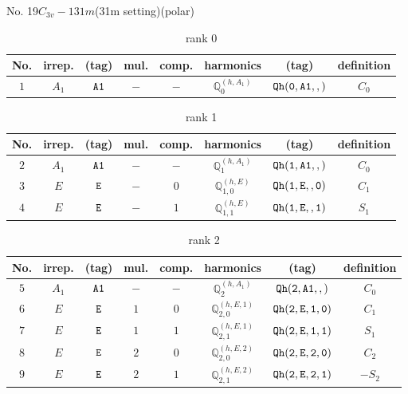 \documentclass[fleqn,8pt]{jsarticle}
\begin{document}
\setcounter{MaxMatrixCols}{16}

\begin{center}
\LARGE
No. 19\quad$C_{3v}-1$\quad$31m$\quad(31m setting)\quad[ trigonal ] (polar)
\end{center}
\begin{table}[ht!]
\begin{center}
\caption{rank 0}
\renewcommand{\arraystretch}{1.3}
\begin{tabular}{cccccccc} \hline \hline
No. & irrep. & (tag) & mul. & comp. & harmonics & (tag) & definition \\ \hline
$ 1 $ & $ A_{1} $ & $ {\tt A1} $ & $ - $ & $ - $ & $ \mathbb{Q}_{0}^{(h,A_{1})} $ & $ {\tt Qh(0,A1,,)} $ & $ C_{0} $ \\
 \hline \hline
\end{tabular}
\end{center}
\end{table}
\begin{table}[ht!]
\begin{center}
\caption{rank 1}
\renewcommand{\arraystretch}{1.3}
\begin{tabular}{cccccccc} \hline \hline
No. & irrep. & (tag) & mul. & comp. & harmonics & (tag) & definition \\ \hline
$ 2 $ & $ A_{1} $ & $ {\tt A1} $ & $ - $ & $ - $ & $ \mathbb{Q}_{1}^{(h,A_{1})} $ & $ {\tt Qh(1,A1,,)} $ & $ C_{0} $ \\
$ 3 $ & $ E $ & $ {\tt E} $ & $ - $ & $ 0 $ & $ \mathbb{Q}_{1,0}^{(h,E)} $ & $ {\tt Qh(1,E,,0)} $ & $ C_{1} $ \\
$ 4 $ & $ E $ & $ {\tt E} $ & $ - $ & $ 1 $ & $ \mathbb{Q}_{1,1}^{(h,E)} $ & $ {\tt Qh(1,E,,1)} $ & $ S_{1} $ \\
 \hline \hline
\end{tabular}
\end{center}
\end{table}
\begin{table}[ht!]
\begin{center}
\caption{rank 2}
\renewcommand{\arraystretch}{1.3}
\begin{tabular}{cccccccc} \hline \hline
No. & irrep. & (tag) & mul. & comp. & harmonics & (tag) & definition \\ \hline
$ 5 $ & $ A_{1} $ & $ {\tt A1} $ & $ - $ & $ - $ & $ \mathbb{Q}_{2}^{(h,A_{1})} $ & $ {\tt Qh(2,A1,,)} $ & $ C_{0} $ \\
$ 6 $ & $ E $ & $ {\tt E} $ & $ 1 $ & $ 0 $ & $ \mathbb{Q}_{2,0}^{(h,E,1)} $ & $ {\tt Qh(2,E,1,0)} $ & $ C_{1} $ \\
$ 7 $ & $ E $ & $ {\tt E} $ & $ 1 $ & $ 1 $ & $ \mathbb{Q}_{2,1}^{(h,E,1)} $ & $ {\tt Qh(2,E,1,1)} $ & $ S_{1} $ \\
$ 8 $ & $ E $ & $ {\tt E} $ & $ 2 $ & $ 0 $ & $ \mathbb{Q}_{2,0}^{(h,E,2)} $ & $ {\tt Qh(2,E,2,0)} $ & $ C_{2} $ \\
$ 9 $ & $ E $ & $ {\tt E} $ & $ 2 $ & $ 1 $ & $ \mathbb{Q}_{2,1}^{(h,E,2)} $ & $ {\tt Qh(2,E,2,1)} $ & $ - S_{2} $ \\
 \hline \hline
\end{tabular}
\end{center}
\end{table}
\end{document}
